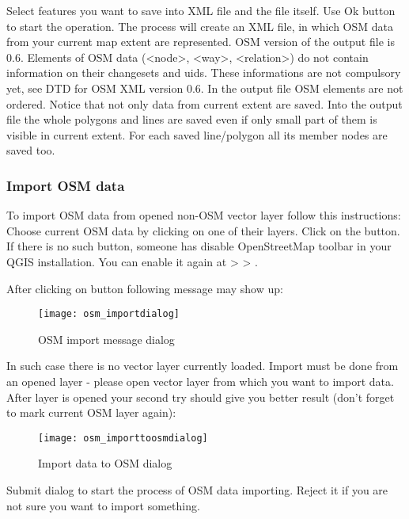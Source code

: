 Select features you want to save into XML file and the file itself.
Use Ok button to start the operation.
The process will create an XML file, in which OSM data from your current map
extent are represented. OSM version of the output file is 0.6. Elements of
OSM data (<node>, <way>, <relation>) do not contain information on their
changesets and uids. These informations are not compulsory yet, see DTD for
OSM XML version 0.6.
In the output file OSM elements are not ordered.
Notice that not only data from current extent are saved. Into the output file
the whole polygons and lines are saved even if only small part of them is
visible in current extent. For each saved line/polygon all its member nodes
are saved too.

\subsubsection{Import OSM data}  

To import OSM data from opened non-OSM vector layer follow this instructions:
Choose current OSM data by clicking on one of their layers. Click on the 
 button. If there is no 
such button, someone has disable OpenStreetMap toolbar in your
QGIS installation. You can enable it again at  > 
 > . 

After clicking on button following message may show up:

\begin{figure}[ht]
   \begin{center}
   \caption{OSM import message dialog \nixcaption}\label{fig:osmimportmessage}\smallskip
   \texttt{[image: osm\_importdialog]}
\end{center}
\end{figure}

In such case there is no vector layer currently loaded. Import must be done
from an opened layer - please open vector layer from which you want to import
data. After layer is opened your second try should give you better result
(don't forget to mark current OSM layer again):

\begin{figure}[ht]
   \begin{center}
   \caption{Import data to OSM dialog \nixcaption}\label{fig:osmimporttoosm}\smallskip
   \texttt{[image: osm\_importtoosmdialog]}
\end{center}
\end{figure}

Submit dialog to start the process of OSM data importing.
Reject it if you are not sure you want to import something.


